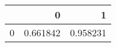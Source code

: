 \begin{tabular}{lrr}
\toprule
{} &         0 &         1 \\
\midrule
0 &  0.661842 &  0.958231 \\
\bottomrule
\end{tabular}
